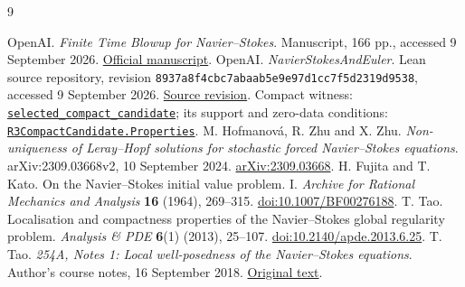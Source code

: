 \documentclass[11pt,a4paper]{article}
\theoremstyle{definition}\newtheorem{definition}[theorem]{Definition}
\theoremstyle{remark}\newtheorem{remark}[theorem]{Remark}
\begin{document}
\begin{thebibliography}{9}\small\raggedright
{}
OpenAI. \emph{Finite Time Blowup for Navier--Stokes}. Manuscript, 166 pp., accessed 9 September 2026.
\href{https://cdn.openai.com/pdf/32d9f210-8b73-45e0-91bc-82a30aef8a9a/navier-stokes.pdf}{Official manuscript}.
OpenAI. \emph{NavierStokesAndEuler}. Lean source repository, revision
\texttt{8937a8f4cbc7abaab5e9e97d1cc7f5d2319d9538}, accessed 9 September 2026.
\href{https://github.com/openai/NavierStokesAndEuler/tree/8937a8f4cbc7abaab5e9e97d1cc7f5d2319d9538}{Source revision}.
Compact witness: \href{https://github.com/openai/NavierStokesAndEuler/blob/8937a8f4cbc7abaab5e9e97d1cc7f5d2319d9538/NavierStokes/R3ActualCandidate.lean#L18-L21}{\texttt{selected\_compact\_candidate}};
its support and zero-data conditions: \href{https://github.com/openai/NavierStokesAndEuler/blob/8937a8f4cbc7abaab5e9e97d1cc7f5d2319d9538/NavierStokes/R3CompactCandidate.lean#L24-L37}{\texttt{R3CompactCandidate.Properties}}.
M. Hofmanov\'a, R. Zhu and X. Zhu.
\emph{Non-uniqueness of Leray--Hopf solutions for stochastic forced Navier--Stokes equations}.
arXiv:2309.03668v2, 10 September 2024.
\href{https://arxiv.org/abs/2309.03668}{arXiv:2309.03668}.
H. Fujita and T. Kato. On the Navier--Stokes initial value problem. I.
\emph{Archive for Rational Mechanics and Analysis} \textbf{16} (1964), 269--315.
\href{https://doi.org/10.1007/BF00276188}{doi:10.1007/BF00276188}.
T. Tao. Localisation and compactness properties of the Navier--Stokes global regularity problem.
\emph{Analysis \& PDE} \textbf{6}(1) (2013), 25--107.
\href{https://doi.org/10.2140/apde.2013.6.25}{doi:10.2140/apde.2013.6.25}.
T. Tao. \emph{254A, Notes 1: Local well-posedness of the Navier--Stokes equations}.
Author's course notes, 16 September 2018.
\href{https://terrytao.wordpress.com/2018/09/16/254a-notes-1-local-well-posedness-of-the-navier-stokes-equations/}{Original text}.
\end{thebibliography}
\end{document}
